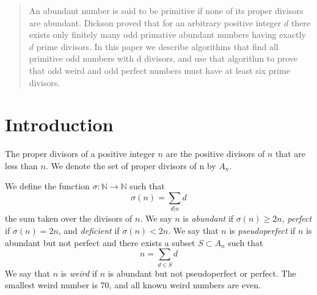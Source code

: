\documentclass[../paper.tex]{article}
\begin{document}
\begin{abstract}
An abundant number is said to be primitive if none of its proper 
divisors are abundant.  Dickson proved that for an arbitrary
positive integer $d$ there exists only finitely many odd primative
abundant numbers having exactly $d$ prime divisors.
In this paper we describe algorithms
that find all primitive odd numbers with d divisors, and use that
algorithm to prove that odd weird and odd perfect numbers must
have at least six prime divisors.

\end{abstract}

\section{Introduction}
The proper divisors of a positive integer $n$ are the positive
divisors of $n$ that are less than $n$. We denote the set of 
proper divisors of n by $\textit{A}_{n}$.

We define the function 
%
$\sigma: \mathbb{N} \rightarrow \mathbb{N}$
%
such that
%
$$\sigma(n) = \sum_{d|n}d$$
%
the sum taken over the divisors of $n$. We say $n$ is 
\textit{abundant} if $\sigma(n) \geq 2n$, \textit{perfect} if 
$\sigma(n) = 2n$, and \textit{deficient} if $\sigma(n) < 2n$.%
We say that $n$ is \textit{pseudoperfect} if $n$ is abundant 
but not perfect and there exists a subset $ S \subset 
\textit{A}_{n}$ such that
%
$$ n = \sum_{d \in S} d$$
%
We say that $n$ is \textit{weird} if $n$ is abundant but not 
pseudoperfect or perfect. The smallest weird number is 70, and 
all known weird numbers are even.
\end{document}
